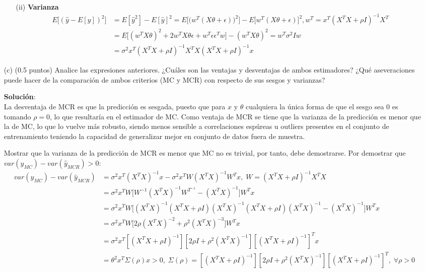 \documentclass[11pt,letterpaper]{article}
\begin{document}
\begin{itemize}
\begin{itemize}
	    \item[(ii)]\textbf{Varianza} \\ 
	     \begin{align*}
	    E\big[(\hat{y}-E[\hat{y}])^{2}\big] & =  E[\hat{y}^{2}]-E[\hat{y}]^{2} = E\big[\big(w^{T}(X\theta+\epsilon)\big)^{2}\big]-E\big[w^{T}(X\theta+\epsilon)\big]^{2}, w^{T}=x^{T}(X^{T}X+\rho I)^{-1}X^{T}\\ 
	    & = E\big[(w^{T}X\theta)^{2}+2w^{T}X\theta\epsilon+w^{T}\epsilon\epsilon^{T}w\big]-(w^{T}X\theta)^{2}=w^{T}\sigma^{2}Iw\\
	    & = \sigma^{2}x^{T}(X^{T}X+\rho I)^{-1}X^{T}X(X^{T}X+\rho I)^{-1}x
	    \end{align*}
	\end{itemize}
	
	\item[(c)] (0.5 puntos) Analice las expresiones anteriores. ¿Cuáles son las ventajas y desventajas de ambos estimadores? ¿Qué aseveraciones  puede hacer de la comparación de ambos criterios (MC y MCR) con respecto de  sus  sesgos y  varianzas?
	
	\textbf{Solución}:\\
	
	La desventaja de MCR es que la predicción es sesgada, puesto que para $x$ y $\theta$ cualquiera la única forma de que el sesgo sea $0$ es tomando $\rho=0$, lo que resultaría en el estimador de MC. Como ventaja de MCR se tiene que la varianza de la predicción es menor que la de MC, lo que lo vuelve más robusto, siendo menos sensible a correlaciones espúreas u outliers presentes en el conjunto de entrenamiento teniendo la capacidad de generalizar mejor en conjunto de datos fuera de muestra. 
	
	Mostrar que la varianza de la predicción de MCR es menor que MC no es trivial, por tanto, debe demostrarse. Por demostrar que $var(\hat{y}_{MC})-var(\hat{y}_{MCR}) > 0$:\\

	\begin{align*}
    var(\hat{y}_{MC})-var(\hat{y}_{MCR}) & =  \sigma^{2}x^{T}(X^{T}X)^{-1}x-\sigma^{2}x^{T}W(X^{T}X)^{-1}W^{T}x,\; W=(X^{T}X+\rho I)^{-1}X^{T}X\\
    & = \sigma^{2}x^{T}W\big[W^{-1}(X^{T}X)^{-1}W^{T^{-1}}-(X^{T}X)^{-1} \big]W^{T}x\\
    & = \sigma^{2}x^{T}W\big[(X^{T}X)^{-1}(X^{T}X+\rho I)(X^{T}X)^{-1}(X^{T}X+\rho I)(X^{T}X)^{-1} -(X^{T}X)^{-1} \big]W^{T}x \\
    & = \sigma^{2}x^{T}W\big[2\rho(X^{T}X)^{-2}+\rho^{2}(X^{T}X)^{-3}\big]W^{T}x\\
    & = \sigma^{2}x^{T}[(X^{T}X+\rho I)^{-1}][2\rho I+\rho^{2}(X^{T}X)^{-1}][(X^{T}X+\rho I)^{-1}]^{T}x\\
    & = \theta^{2}x^{T}\Sigma(\rho) x >0, \;\Sigma(\rho)=[(X^{T}X+\rho I)^{-1}][2\rho I+\rho^{2}(X^{T}X)^{-1}][(X^{T}X+\rho I)^{-1}]^{T}, \; \forall \rho >0
	\end{align*}
	

\end{itemize}
\end{document}
